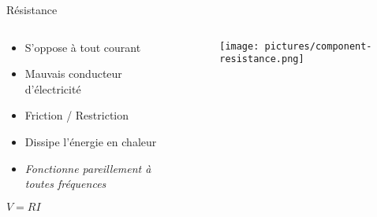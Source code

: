 \begin{frame}{Résistance}
    \begin{columns}
        \begin{column}{0.66\textwidth}
            \begin{itemize}
                \item S'oppose à tout courant
                \item Mauvais conducteur d'électricité
                \item Friction / Restriction
                \item Dissipe l'énergie en chaleur
                \item \textit{Fonctionne pareillement à toutes fréquences}
            \end{itemize}
            \par
            \begin{center}
                \Large{$V = RI$}
            \end{center}
        \end{column}
        \begin{column}{0.33\textwidth}
            \begin{figure}
                \centering
                \texttt{[image: pictures/component-resistance.png]}
            \end{figure}
        \end{column}
    \end{columns}
\end{frame}





\iffalse


